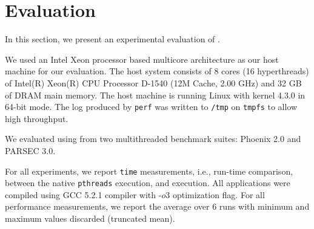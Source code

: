 \section{Evaluation}
\label{sec:evaluation}
In this section, we present an experimental evaluation of \projecttitle.%
%





 We used an Intel Xeon processor based
multicore architecture as our host machine for our evaluation. The
host system consists of 8 cores (16 hyperthreads) of Intel(R) Xeon(R) CPU Processor D-1540
(12M Cache, 2.00 GHz) and 32 GB of DRAM main memory. The host
machine is running Linux with kernel 4.3.0 in 64-bit mode. The log produced by
{\tt perf} was written to {\tt /tmp} on {\tt tmpfs} to allow high throughput.


  We evaluated \projecttitle using from two multithreaded benchmark suites: Phoenix 2.0 and PARSEC 3.0. 

%

  For all experiments,  we report {\tt time}
measurements, i.e., run-time comparison, between the native {\tt pthreads}
execution, and \projecttitle execution.  All applications were compiled using
GCC 5.2.1 compiler with -$o3$ optimization flag. For all performance
measurements, we report the average over 6 runs with minimum and maximum values
discarded (truncated mean).

